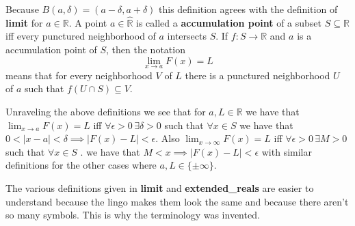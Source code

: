 \documentclass[10pt,a4paper,UTF8]{article}
\begin{document}
Because \(B(a,\delta)=(a-\delta,a+\delta)\) this definition agrees
with the definition  of \textbf{limit} for \(a\in\mathbb{R}\).
A point \(a\in\hat{\mathbb{R}}\) is called a \textbf{accumulation point} of a subset \(S\subseteq\mathbb{R}\)
iff every punctured neighborhood of \(a\) intersects \(S\).
If \(f:S\to\mathbb{R}\) and \(a\) is a accumulation point of \(S\), then the notation
$$
     \lim_{x\to a} F(x)=L
$$
means that for every neighborhood \(V\) of \(L\) there is a punctured neighborhood
\(U\) of \(a\) such that \(f(U\cap S)\subseteq V\).


Unraveling the above definitions we see that for \(a,L\in\mathbb{R}\)  we have that
\(\lim_{x\to a} F(x)=L\) iff \(\forall \epsilon > 0\,\exists \delta > 0\) such that \(\forall x\in S\)
we have that \(0 < |x-a| < \delta\implies |F(x)-L| < \epsilon\). Also \(\lim_{x\to\infty} F(x)=L\) iff \(\forall \epsilon > 0\,\exists M > 0\) such that \(\forall x\in S\) . we have that  \(M < x\implies |F(x)-L| < \epsilon\)
with similar definitions for the other cases where \(a,L\in\{\pm\infty\}\).

The various definitions given in \textbf{limit} and \textbf{extended\_reals} are easier
to understand because the lingo makes them look the same and because there aren't so
many symbols. This is why the terminology was invented.
\end{document}
